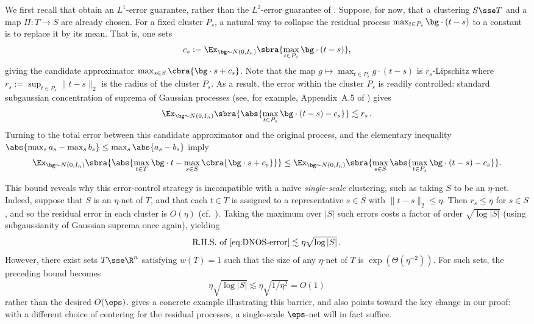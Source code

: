 \documentclass[11pt]{article}
\begin{document}
We first recall that \cite{de2026sparsifying} obtain an $L^1$-error guarantee, rather than the $L^2$-error guarantee of . 
Suppose, for now, that a clustering $S \sse T$ and a map $\Pi: T \to S$ are already chosen. 
For a fixed cluster $P_s$, a natural way to collapse the residual process $\max_{t\in P_s}\bg\cdot(t-s)$ to a constant is to replace it by its mean. 
That is, one sets
\begin{equation} \label{eq:DNOS-shift-choices}
	c_s
	:=
	\Ex_{\bg\sim N(0,I_n)}
	\sbra{
		\max_{t\in P_s}\bg\cdot(t-s)
	},
\end{equation}
giving the candidate approximator $\max_{s\in S}\cbra{\bg\cdot s+c_s}$. 
Note that the map $g \mapsto \max_{t\in P_s}g\cdot(t-s)$
is $r_s$-Lipschitz where $r_s:=\sup_{t\in P_s}\|t-s\|_2$ is the radius of the cluster $P_s$. 
As a result, the error within the cluster $P_s$ is readily controlled: standard subgaussian concentration of suprema of Gaussian processes
(see, for example, Appendix~A.5 of \cite{chatterjee2014superconcentration}) gives 
\begin{equation} 
\label{eq:DNOS-single-cluster-error}
	\Ex_{\bg\sim N(0,I_n)}
	\sbra{
		\abs{
			\max_{t\in P_s}\bg\cdot(t-s)-c_s
		}
	}
	\lesssim r_s\,.
\end{equation}
Turning to the total error between this candidate approximator and the original process, 
 and the elementary inequality $\abs{\max_s a_s-\max_s b_s}\leq \max_s\abs{a_s-b_s}$ imply   
\begin{equation} \label{eq:DNOS-error} 
	\Ex_{\bg\sim N(0,I_n)}
	\sbra{
		\abs{
			\max_{t\in T}\bg\cdot t
			-
			\max_{s\in S}\cbra{\bg\cdot s+c_s}
		}
	}
	\leq
	\Ex_{\bg\sim N(0,I_n)}
	\sbra{
		\max_{s\in S}
		\abs{
			\max_{t\in P_s}\bg\cdot(t-s)
			-
			c_s
		}
	}.
\end{equation}

This bound reveals why this error-control strategy is incompatible with a naive \emph{single-scale} clustering, such as taking $S$ to be an $\eta$-net. 
Indeed, suppose that $S$ is an $\eta$-net of $T$, and that each $t\in T$ is assigned to a representative $s \in S$ with $\|t-s\|_2 \leq \eta$.
Then $r_s \leq \eta$ for $s \in S$, and so the residual error in each cluster is $O(\eta)$ (cf.~).  
Taking the maximum over $|S|$ such errors costs a factor of order $\sqrt{\log |S|}$ (using subgaussianity of Gaussian suprema once again), yielding  
\[
	\text{R.H.S. of \Cref{eq:DNOS-error}}
	\lesssim
	\eta\sqrt{\log |S|}\,.
\]
However, there exist sets $T \sse \R^n$ satisfying $w(T) = 1$ such that the size of any $\eta$-net of $T$ is $\exp(\Theta(\eta^{-2}))$.  
For such sets, the preceding bound becomes
\[
	\eta\sqrt{\log |S|}
	\lesssim 
	\eta\sqrt{1/\eta^2}
	=
	O(1)
\]
rather than the desired $O(\eps)$. 
 gives a concrete example illustrating this barrier, and also points toward the key change in our proof: with a different choice of centering for the residual processes, a single-scale $\eps$-net will in fact suffice. 
\end{document}
